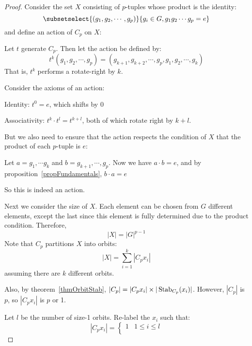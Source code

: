 \documentclass[../Main.tex]{subfiles}
\begin{document}
\begin{proof}
    Consider the set $X$ consisting of $p$-tuples whose product is the identity:
    \begin{equation}
        \subsetselect{(g_1, g_2, \cdots, g_p)}{g_i \in G, g_1 g_2 \cdots g_p = e}
    \end{equation}
    and define an action of $C_p$ on $X$:\par
    Let $t$ generate $C_p$. Then let the action be defined by:
    \begin{equation*}
        t^k(g_1, g_2, \cdots, g_p) = (g_{k+1}, g_{k+2}, \cdots, g_p, g_1, g_2, \cdots, g_k)
    \end{equation*}
    That is, $t^k$ performs a rotate-right by $k$.\par
    Consider the axioms of an action:\par
    Identity: $t^0 = e$, which shifts by 0 \tick\par
    Associativity: $t^k \cdot t^l = t^{k + l}$, both of which rotate right by $k + l$.\tick\par
    But we also need to ensure that the action respects the condition of $X$ that the product of each $p$-tuple is $e$:\par
    Let $a = g_1, \cdots g_k$ and $b = g_{k + 1}, \cdots, g_p$. Now we have $a \cdot b = e$, and by proposition~\ref{propFundamentals}, $b \cdot a = e$ \tick\par
    So this is indeed an action.\par
    Next we consider the size of $X$. Each element can be chosen from $G$ different elements, except the last since this element is fully determined due to the product condition. Therefore,
    \begin{equation}
        |X| = |G|^{p-1}
    \end{equation}
    Note that $C_p$ partitions $X$ into orbits:
    \begin{equation*}
        |X| = \sum_{i=1}^{k} |C_p x_i|
    \end{equation*}
    assuming there are $k$ different orbits.\par
    Also, by theorem~\ref{thmOrbitStab}, $|C_p| = |C_p x_i| \times |\operatorname{Stab}_{C_p}(x_i)|$. However, $|C_p|$ is $p$, so $|C_p x_i|$ is $p$ or 1.\par
    Let $l$ be the number of size-1 orbits. Re-label the $x_i$ such that:
    \begin{equation*}
        |C_p x_i| =
        \begin{cases}
            1 & 1 \leq i \leq l \\

\end{cases}
\end{equation*}
\end{proof}
\end{document}
